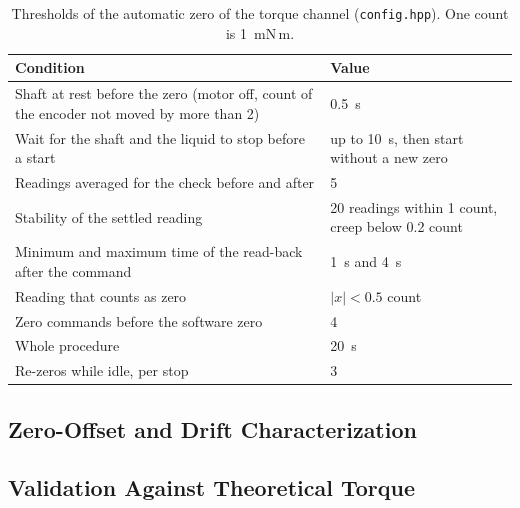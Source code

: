 \begin{table}[htbp]
    \centering
    \caption[Thresholds of the automatic torque zero]{Thresholds of the automatic zero of the torque channel (\texttt{config.hpp}). One count is 1~mN\,m.}
    \label{tab:tare}
    \small
    \begin{tabular}{@{}p{7.2cm}p{4.6cm}@{}}
        \toprule
        Condition & Value \\
        \midrule
        Shaft at rest before the zero (motor off, count of the encoder not moved by more than 2) & 0.5~s \\
        Wait for the shaft and the liquid to stop before a start & up to 10~s, then start without a new zero \\
        Readings averaged for the check before and after & 5 \\
        Stability of the settled reading & 20 readings within 1 count, creep below 0.2 count \\
        Minimum and maximum time of the read-back after the command & 1~s and 4~s \\
        Reading that counts as zero & $|x| < 0.5$ count \\
        Zero commands before the software zero & 4 \\
        Whole procedure & 20~s \\
        Re-zeros while idle, per stop & 3 \\
        \bottomrule
    \end{tabular}
\end{table}

\subsection{Zero-Offset and Drift Characterization}
\label{subsec:agit-torque-drift}


\subsection{Validation Against Theoretical Torque}
\label{subsec:agit-torque-test}

